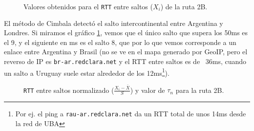\begin{figure}[H]
    \caption{Valores obtenidos para el \texttt{RTT} entre saltos ($X_i$) de la ruta 2B.}
    \label{res:escb2:rtt}
\end{figure}

El método de Cimbala detectó el salto intercontinental entre Argentina y Londres. Si miramos el gráfico \ref{res:escb2:rtt}, vemos que el único salto que supera los 50ms es el 9, y el siguiente en ms es el salto 8, que por lo que vemos corresponde a un enlace entre Argentina y Brasil (no se ve en el mapa generado por GeoIP, pero el reverso de IP es \texttt{br-ar.redclara.net} y el RTT entre saltos es de ~36ms, cuando un salto a Uruguay suele estar alrededor de los 12ms\footnote{Por ej. el ping a \texttt{rau-ar.redclara.net} da un RTT total de unos 14ms desde la red de UBA}).

\begin{figure}[H]
    \caption{\texttt{RTT} entre saltos normalizado ($\frac{X_i-\bar{X}}{S}$)
    y valor de $\tau_n$ para la ruta 2B.}
    \label{res:escb2:rttnorm}
\end{figure}